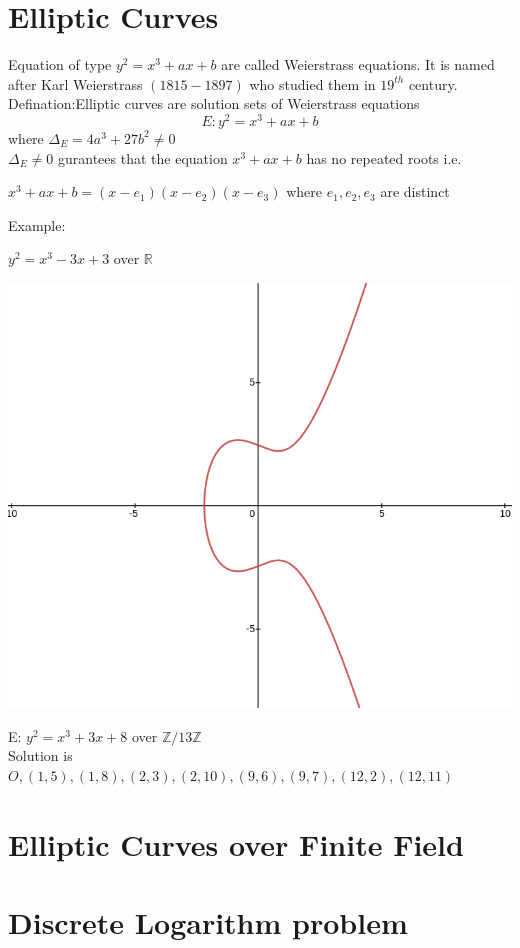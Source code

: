 \documentclass[12pt,a4paper]{report}
\begin{document}
	\section{Elliptic Curves}
Equation of type $ y^2 = x^3+ax+b $ are called Weierstrass equations. It is named after Karl Weierstrass $(1815-1897)$ who studied them in $19^{th}$ century. \\
Defination:Elliptic curves are solution sets of Weierstrass equations$$E:y^2 = x^3+ax+b$$ where $\Delta_E = 4a^3+27b^2\neq 0$ \\
$\Delta_E \neq 0$ gurantees that the equation $x^3+ax+b$ has no repeated roots i.e. 

$ x^3+ax+b=(x-e_1)(x-e_2)(x-e_3)$ where $e_1,e_2,e_3$ are distinct

Example:

$y^2 = x^3-3x+3$ over $\mathbb{R}$

\includegraphics[scale=0.3]{graph_ex1}

E: $y^2 = x^3+3x+8$ over $\mathbb{Z}/13\mathbb{Z}$\\
Solution is  $O,(1,5),(1,8),(2,3),(2,10),(9,6),(9,7),(12,2),(12,11)$ 




	\section{Elliptic Curves over Finite Field}
	\section{Discrete Logarithm problem}
\end{document}
